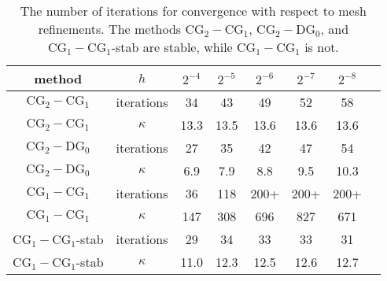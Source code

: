 \begin{table}
\begin{center}
\begin{tabular}{|c|c||c|c|c|c|c|c|}
\hline
method & $h$ & $2^{-4}$ & $2^{-5}$ & $2^{-6}$ & $2^{-7}$ & $2^{-8}$ \\ \hline\hline
$\mathrm{CG}_2-\mathrm{CG}_1$ &  iterations & 34 & 43 & 49 & 52 & 58 \\ \hline
$\mathrm{CG}_2-\mathrm{CG}_1$ & $\kappa $ & 13.3 & 13.5 & 13.6 & 13.6 & 13.6 \\ \hline
$\mathrm{CG}_2-\mathrm{DG}_0$ &  iterations & 27 & 35 & 42 & 47 & 54 \\ \hline
$\mathrm{CG}_2-\mathrm{DG}_0$ & $\kappa $ & 6.9 & 7.9 & 8.8 & 9.5 & 10.3 \\ \hline
$\mathrm{CG}_1-\mathrm{CG}_1$ & iterations & 36 & 118 & 200+ & 200+ & 200+ \\ \hline
$\mathrm{CG}_1-\mathrm{CG}_1$ & $\kappa$ & 147 & 308 & 696 & 827 & 671 \\ \hline
$\mathrm{CG}_1-\mathrm{CG}_1$-stab& iterations & 29 & 34 & 33 & 33 & 31 \\ \hline
$\mathrm{CG}_1-\mathrm{CG}_1$-stab& $\kappa $ & 11.0 & 12.3 & 12.5 & 12.6 & 12.7 \\ \hline
\end{tabular}
\caption{The number of iterations for
  convergence with respect to mesh refinements.
  The methods $\mathrm{CG}_2-\mathrm{CG}_1$, $\mathrm{CG}_2-\mathrm{DG}_0$, and $\mathrm{CG}_1-\mathrm{CG}_1$-stab are stable, while $\mathrm{CG}_1-\mathrm{CG}_1$ is not.}\label{stokes:ex}
\end{center}
\end{table}


